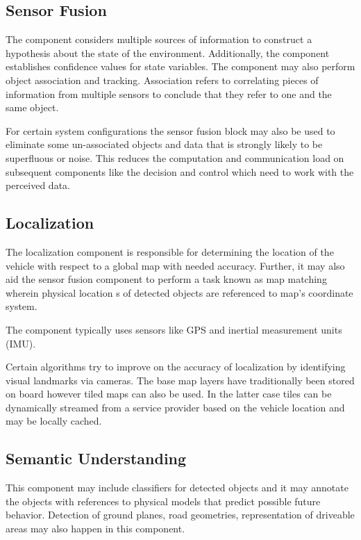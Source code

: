 \subsection{Sensor Fusion}

The component considers multiple sources of information to construct a hypothesis about the state of the environment. 
Additionally, the component establishes confidence values for state variables. 
The component may also perform object association and tracking. Association refers to correlating pieces of
information from multiple sensors to conclude that they refer to one and the same object.

For certain system configurations the sensor fusion block may also be used to eliminate some un-associated objects and data that 
is strongly likely to be superfluous or noise. This reduces the computation and communication load on 
subsequent components like the decision and control which need to work with the perceived data.


\subsection{Localization}

The localization component is responsible for determining the location of the vehicle with respect to a global map with needed accuracy.
Further, it may also aid the sensor fusion component to perform a task known as map matching wherein physical location s of detected objects are referenced to map’s coordinate system. 

The component typically uses sensors like GPS and inertial measurement units (IMU).

Certain algorithms try to improve on the accuracy of localization by identifying visual landmarks via cameras. The base map layers have traditionally been stored on board however tiled maps can also be used. In the latter case tiles can be dynamically streamed from a service provider based on the vehicle location and may be locally cached.

\subsection{Semantic Understanding}
This component may include classifiers for detected objects and it may annotate the objects with references to physical models that predict possible future behavior. Detection of ground planes, road geometries, representation of driveable areas may also happen in this component.

